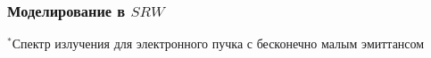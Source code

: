 \documentclass[14pt, hyperref = {colorlinks},xcolor=table ]{beamer}
\begin{document}
\small
\begin{frame}
\frametitle{Моделирование в $SRW$}\label{t1}
\vspace{-21pt}
\begin{figure}[h]
	\begin{minipage}[h]{0.49\linewidth}
	\end{minipage}
	\begin{minipage}[h]{0.49\linewidth}
		\vspace{-10pt}
	\end{minipage}	
\end{figure}
\vspace{-40pt}
\begin{figure}[h]
\end{figure}
\vspace{10pt}
\tiny{$^*$Спектр излучения для электронного пучка с бесконечно малым эмиттансом}
\end{frame}
\end{document}
